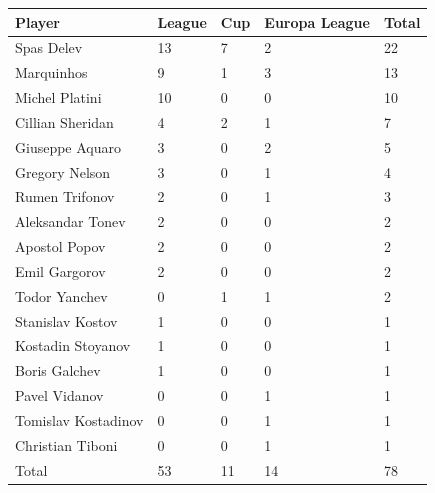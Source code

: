 \documentclass{article}
\begin{document}
\begin{tabular}{lllll}
\toprule
Player & League & Cup & Europa League & Total \\
\midrule
Spas Delev & 13 & 7 & 2 & 22 \\
Marquinhos & 9 & 1 & 3 & 13 \\
Michel Platini & 10 & 0 & 0 & 10 \\
Cillian Sheridan & 4 & 2 & 1 & 7 \\
Giuseppe Aquaro & 3 & 0 & 2 & 5 \\
Gregory Nelson & 3 & 0 & 1 & 4 \\
Rumen Trifonov & 2 & 0 & 1 & 3 \\
Aleksandar Tonev & 2 & 0 & 0 & 2 \\
Apostol Popov & 2 & 0 & 0 & 2 \\
Emil Gargorov & 2 & 0 & 0 & 2 \\
Todor Yanchev & 0 & 1 & 1 & 2 \\
Stanislav Kostov & 1 & 0 & 0 & 1 \\
Kostadin Stoyanov & 1 & 0 & 0 & 1 \\
Boris Galchev & 1 & 0 & 0 & 1 \\
Pavel Vidanov & 0 & 0 & 1 & 1 \\
Tomislav Kostadinov & 0 & 0 & 1 & 1 \\
Christian Tiboni & 0 & 0 & 1 & 1 \\
Total & 53 & 11 & 14 & 78 \\
\bottomrule
\end{tabular}
\end{document}
